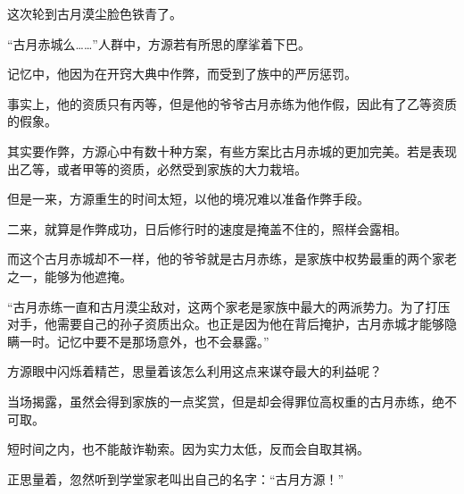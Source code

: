 \begin{this_body}
这次轮到古月漠尘脸色铁青了。

“古月赤城么……”人群中，方源若有所思的摩挲着下巴。

记忆中，他因为在开窍大典中作弊，而受到了族中的严厉惩罚。

事实上，他的资质只有丙等，但是他的爷爷古月赤练为他作假，因此有了乙等资质的假象。

其实要作弊，方源心中有数十种方案，有些方案比古月赤城的更加完美。若是表现出乙等，或者甲等的资质，必然受到家族的大力栽培。

但是一来，方源重生的时间太短，以他的境况难以准备作弊手段。

二来，就算是作弊成功，日后修行时的速度是掩盖不住的，照样会露相。

而这个古月赤城却不一样，他的爷爷就是古月赤练，是家族中权势最重的两个家老之一，能够为他遮掩。

“古月赤练一直和古月漠尘敌对，这两个家老是家族中最大的两派势力。为了打压对手，他需要自己的孙子资质出众。也正是因为他在背后掩护，古月赤城才能够隐瞒一时。记忆中要不是那场意外，也不会暴露。”

方源眼中闪烁着精芒，思量着该怎么利用这点来谋夺最大的利益呢？

当场揭露，虽然会得到家族的一点奖赏，但是却会得罪位高权重的古月赤练，绝不可取。

短时间之内，也不能敲诈勒索。因为实力太低，反而会自取其祸。

正思量着，忽然听到学堂家老叫出自己的名字：“古月方源！”

\end{this_body}

